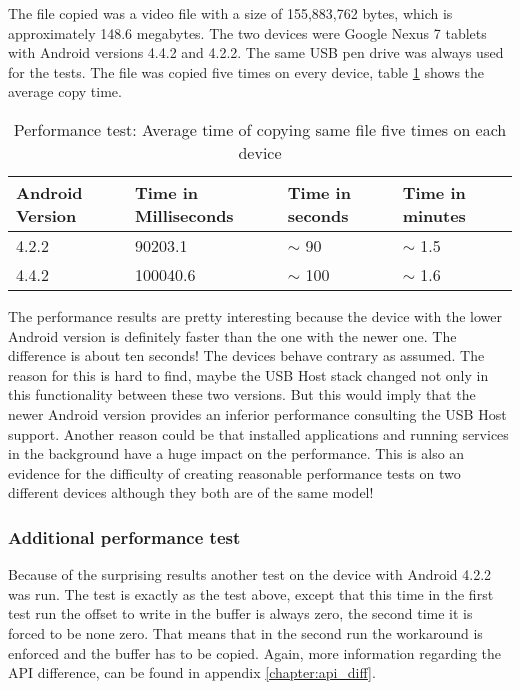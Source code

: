 The file copied was a video file with a size of 155,883,762 bytes, which is approximately 148.6 megabytes. The two devices were Google Nexus 7 tablets with Android versions 4.4.2 and 4.2.2. The same USB pen drive was always used for the tests. The file was copied five times on every device, table \ref{table:performance_test} shows the average copy time.

\begin{table}[ht]
\caption{Performance test: Average time of copying same file five times on each device}
\centering
\begin{tabular}{|l|l|l|l|}
\hline\hline
\textbf{Android Version} & \textbf{Time in Milliseconds} & \textbf{Time in seconds} & \textbf{Time in minutes} \\ \hline
4.2.2 & 90203.1 & $\sim$ 90 & $\sim$ 1.5 \\ \hline
4.4.2 & 100040.6 & $\sim$ 100 & $\sim$ 1.6 \\ \hline
\end{tabular}
\label{table:performance_test}
\end{table}

The performance results are pretty interesting because the device with the lower Android version is definitely faster than the one with the newer one. The difference is about ten seconds! The devices behave contrary as assumed. The reason for this is hard to find, maybe the USB Host stack changed not only in this functionality between these two versions. But this would imply that the newer Android version provides an inferior performance consulting the USB Host support. Another reason could be that installed applications and running services in the background have a huge impact on the performance. This is also an evidence for the difficulty of creating reasonable performance tests on two different devices although they both are of the same model!

\subsubsection{Additional performance test}

Because of the surprising results another test on the device with Android 4.2.2 was run. The test is exactly as the test above, except that this time in the first test run the offset to write in the buffer is always zero, the second time it is forced to be none zero. That means that in the second run the workaround is enforced and the buffer has to be copied. Again, more information regarding the API difference, can be found in appendix \ref{chapter:api_diff}.

